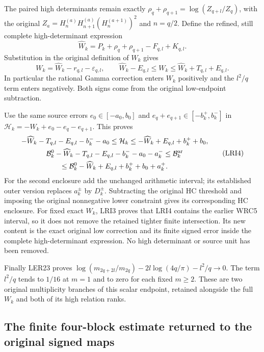 \documentclass[11pt,a4paper]{article}
\begin{document}
The paired high determinants remain exactly
$\rho_q+\rho_{q+1}=\log(Z_{q+l}/Z_q)$, with the original
$Z_a=H_n^{(a)}H_{n+1}^{(a)}(H_n^{(a+1)})^2$ and $n=q/2$.
Define the refined, still complete high-determinant expression
\[
 \widehat W_k=P_k+\rho_q+\rho_{q+1}-F_{q,l}+K_{q,l}.
\]
Substitution in the original definition of $W_k$ gives
\[
 W_k=\widehat W_k-r_{q,l}-\varepsilon_{q,l},\qquad
 \widehat W_k-E_{q,l}\leq W_k
                  \leq\widehat W_k+T_{q,l}+E_{q,l}.
 \tag{LRI3}
\]
In particular the rational Gamma correction enters $W_k$
positively and the $l^2/q$ term enters negatively. Both signs
come from the original low-endpoint subtraction.

Use the same source errors $e_0\in[-a_0,b_0]$ and
$e_q+e_{q+1}\in[-b_k^+,b_k^-]$ in
$\mathcal H_k=-W_k+e_0-e_q-e_{q+1}$. This proves
\[
\begin{gathered}
 -\widehat W_k-T_{q,l}-E_{q,l}-b_k^--a_0
 \leq\mathcal H_k
 \leq-\widehat W_k+E_{q,l}+b_k^++b_0,\\
 \mathcal B_k^0-\widehat W_k-T_{q,l}-E_{q,l}-b_k^--a_0-a_k^-
 \leq\mathcal B_k^{\rm ar}\\
 \leq\mathcal B_k^0-\widehat W_k+E_{q,l}+b_k^++b_0+a_k^+.
\end{gathered}\tag{LRI4}
\]
For the second enclosure add the unchanged arithmetic interval;
its established outer version replaces $a_k^\pm$ by $D_k^\pm$.
Subtracting the original HC threshold and imposing the original
nonnegative lower constraint gives its corresponding HC enclosure.
For fixed exact $W_k$, LRI3 proves that LRI4 contains the earlier
WRC5 interval, so it does not remove the retained tighter finite
intersection. Its new content is the exact original low correction
and its finite signed error inside the complete high-determinant
expression. No high determinant or source unit has been removed.

Finally LER23 proves
$\log(m_{2q+2l}/m_{2q})-2l\log(4q/\pi)-l^2/q\to0$.
The term $l^2/q$ tends to $1/16$ at $m=1$ and to zero for
each fixed $m\geq2$. These are two original multiplicity
branches of this scalar endpoint, retained alongside the full
$W_k$ and both of its high relation ranks.


\subsection{The finite four-block estimate returned to the original signed maps}
\end{document}
